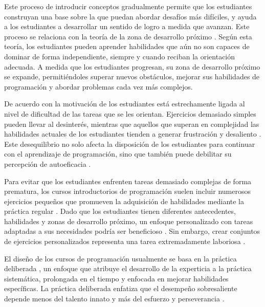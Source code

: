 \documentclass{article}
\begin{document}
Este proceso de introducir conceptos gradualmente permite que los estudiantes construyan una base sobre la que puedan abordar desafíos más difíciles, y ayuda a los estudiantes a desarrollar un sentido de logro a medida que avanzan. Este proceso se relaciona con la teoría de la zona de desarrollo próximo \cite{vygotsky1978mind}. Según esta teoría, los estudiantes pueden aprender habilidades que aún no son capaces de dominar de forma independiente, siempre y cuando reciban la orientación adecuada. A medida que los estudiantes progresan, su zona de desarrollo próximo se expande, permitiéndoles superar nuevos obstáculos, mejorar sus habilidades de programación y abordar problemas cada vez más complejos.

De acuerdo con \cite{rosenzweig2019expectancy} la motivación de los estudiantes está estrechamente ligada al nivel de dificultad de las tareas que se les orientan. Ejercicios demasiado simples pueden llevar al desinterés, mientras que aquellos que superan en complejidad las habilidades actuales de los estudiantes tienden a generar frustración y desaliento \cite{rosenzweig2019expectancy}. Este desequilibrio no solo afecta la disposición de los estudiantes para continuar con el aprendizaje de programación, sino que también puede debilitar su percepción de autoeficacia \cite{bandura1977self}.

Para evitar que los estudiantes enfrenten tareas demasiado complejas de forma prematura, los cursos introductorios de programación suelen incluir numerosos ejercicios pequeños que promueven la adquisición de habilidades mediante la práctica regular \cite{allen2018msp, vihavainen2011extreme}. Dado que los estudiantes tienen diferentes antecedentes, habilidades y zonas de desarrollo próximo, un enfoque personalizado con tareas adaptadas a sus necesidades podría ser beneficioso \cite{leinonen2021exploring}. Sin embargo, crear conjuntos de ejercicios personalizados representa una tarea extremadamente laboriosa \cite{lobb2016coderunner, wrenn2018whotests}.

El diseño de los cursos de programación usualmente se basa en la práctica deliberada \cite{ericsson1993deliberate}, un enfoque que atribuye el desarrollo de la experticia a la práctica sistemática, prolongada en el tiempo y enfocada en mejorar habilidades específicas. La práctica deliberada enfatiza que el desempeño sobresaliente depende menos del talento innato y más del esfuerzo y perseverancia \cite{duckworth2013true}.

\end{document}
